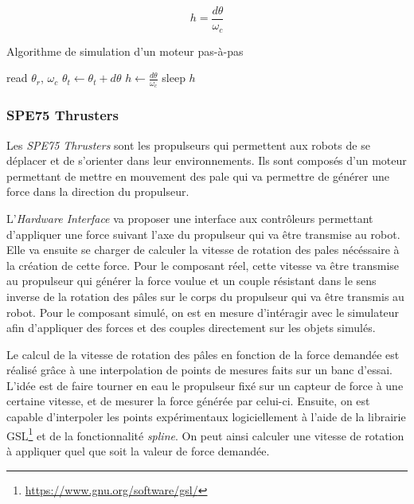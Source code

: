 				$$h = \frac{d\theta}{\omega_c}$$

				\begin{algorithm}[!htb]
					\caption{Algorithme de simulation d'un moteur pas-à-pas}
					\label{algo:stepper_motor}
					\begin{algorithmic}
							\STATE read $\theta_r$, $\omega_c$
								\STATE $\theta_t \leftarrow \theta_t + d\theta$
							\ENDIF
							\STATE $h \leftarrow \frac{d\theta}{\omega_c}$
							\STATE sleep $h$
						\ENDWHILE
					\end{algorithmic}
				\end{algorithm}

			\subsubsection{SPE75 Thrusters}
		
				Les \textit{SPE75 Thrusters} sont les propulseurs qui permettent aux robots de se déplacer et de s'orienter dans leur environnements. Ils sont composés d'un moteur permettant de mettre en mouvement des pale qui va permettre de générer une force dans la direction du propulseur.
				
				L'\textit{Hardware Interface} va proposer une interface aux contrôleurs permettant d'appliquer une force suivant l'axe du propulseur qui va être transmise au robot. Elle va ensuite se charger de calculer la vitesse de rotation des pales nécéssaire à la création de cette force. Pour le composant réel, cette vitesse va être transmise au propulseur qui générer la force voulue et un couple résistant dans le sens inverse de la rotation des pâles sur le corps du propulseur qui va être transmis au robot. Pour le composant simulé, on est en mesure d'intéragir avec le simulateur afin d'appliquer des forces et des couples directement sur les objets simulés. 
				
				Le calcul de la vitesse de rotation des pâles en fonction de la force demandée est réalisé grâce à une interpolation de points de mesures faits sur un banc d'essai. L'idée est de faire tourner en eau le propulseur fixé sur un capteur de force à une certaine vitesse, et de mesurer la force générée par celui-ci. Ensuite, on est capable d'interpoler les points expérimentaux logiciellement à l'aide de la librairie \gls{GSL}\footnote{\url{https://www.gnu.org/software/gsl/}} et de la fonctionnalité \textit{spline}. On peut ainsi calculer une vitesse de rotation à appliquer quel que soit la valeur de force demandée.
				
